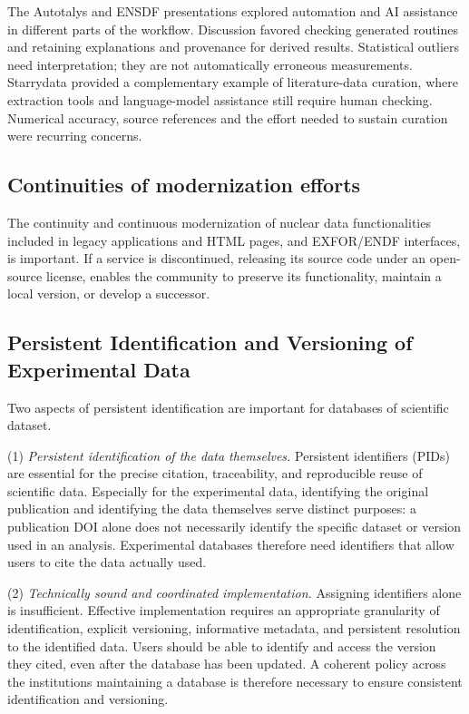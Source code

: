 The Autotalys and ENSDF presentations explored automation and AI assistance in different parts of the workflow. Discussion favored checking generated routines and retaining explanations and provenance for derived results. Statistical outliers need interpretation; they are not automatically erroneous measurements. Starrydata provided a complementary example of literature-data curation, where extraction tools and language-model assistance still require human checking. Numerical accuracy, source references and the effort needed to sustain curation were recurring concerns.

\subsection{Continuities of modernization efforts}

The continuity and continuous modernization of nuclear data functionalities included in legacy applications and HTML pages, and EXFOR/ENDF interfaces, is important. If a service is discontinued, releasing its source code under an open-source license, enables the community to preserve its functionality, maintain a local version, or develop a successor.



\subsection{Persistent Identification and Versioning of Experimental Data}

Two aspects of persistent identification are important for databases of scientific dataset.

\noindent (1) \textit{Persistent identification of the data themselves.}
Persistent identifiers (PIDs) are essential for the precise citation, traceability, and reproducible reuse of scientific data. Especially for the experimental data, identifying the original publication and identifying the data themselves serve distinct purposes: a publication DOI alone does not necessarily identify the specific dataset or version used in an analysis. Experimental databases therefore need identifiers that allow users to cite the data actually used.

\noindent (2) \textit{Technically sound and coordinated implementation.}
Assigning identifiers alone is insufficient. Effective implementation requires an appropriate granularity of identification, explicit versioning, informative metadata, and persistent resolution to the identified data. Users should be able to identify and access the version they cited, even after the database has been updated. A coherent policy across the institutions maintaining a database is therefore necessary to ensure consistent identification and versioning.

